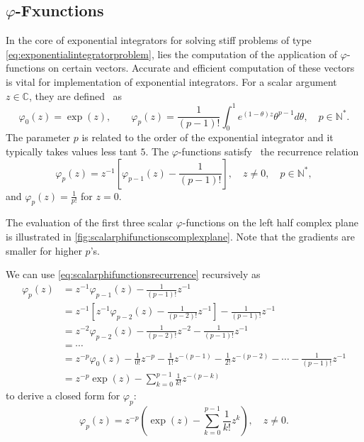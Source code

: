 \subsection{\texorpdfstring{$\varphi$}{Phi}-Fxunctions}
In the core of exponential integrators for solving stiff problems of type
\eqref{eq:exponentialintegratorproblem}, lies the computation of the application of
$\varphi$-functions on certain vectors. Accurate and efficient computation of these vectors
is vital for implementation of exponential integrators.
For a scalar argument $z \in \mathbb{C}$, they are defined~\cite{higham2008functions} as
\begin{equation}
    \label{eq:scalarphifunctionsdefinition}
    \varphi_0(z) = \exp(z), \qquad
    \varphi_p(z) = \frac{1}{(p-1)!} \int_{0}^{1}{e^{(1 - \theta)z} \theta^{p-1} d\theta},
    \quad p \in \mathbb{N^*}.
\end{equation}
The parameter $p$ is related to the order of the exponential integrator and it typically takes
values less tant $5$.
The $\varphi$-functions satisfy~\cite{higham2008functions} the recurrence relation
\begin{equation}
    \label{eq:scalarphifunctionsrecurrence}
    \varphi_p(z) = z^{-1} \left[ \varphi_{p-1}(z) - \frac{1}{(p-1)!} \right] ,
    \quad z \neq 0, \quad p \in \mathbb{N^*},
\end{equation}
and $\varphi_p(z) = \frac{1}{p!}$ for $z=0$.

The evaluation of the first three scalar $\varphi$-functions on the left half complex plane
is illustrated in \autoref{fig:scalarphifunctionscomplexplane}. Note that the gradients are
smaller for higher $p$'s.


We can use \eqref{eq:scalarphifunctionsrecurrence} recursively as
\begin{equation*}
    \begin{aligned}
        \varphi_p(z) & = z^{-1} \varphi_{p-1}(z) - \frac{1}{(p-1)!} z^{-1} \\
        & = z^{-1} \left[ z^{-1} \varphi_{p-2}(z) - \frac{1}{(p-2)!} z^{-1} \right] - \frac{1}{(p-1)!} z^{-1} \\
        & = z^{-2} \varphi_{p-2}(z) - \frac{1}{(p-2)!} z^{-2} - \frac{1}{(p-1)!} z^{-1} \\
        & = \cdots \\
        & = z^{-p} \varphi_{0}(z) - \frac{1}{0!} z^{-p} - \frac{1}{1!} z^{-(p-1)} - \frac{1}{2!} z^{-(p-2)} - \cdots - \frac{1}{(p-1)!} z^{-1} \\
        & = z^{-p} \exp(z) - \sum_{k=0}^{p-1}{\frac{1}{k!}z^{-(p-k)}}
        \end{aligned}
\end{equation*}
to derive a closed form for $\varphi_p$:
\begin{equation}
    \label{eq:scalarphifunctionsclosedform}
    \varphi_p(z) = z^{-p} \left( \exp(z) - \sum_{k=0}^{p-1}{\frac{1}{k!}z^{k}} \right), \quad z \neq 0.
\end{equation}

